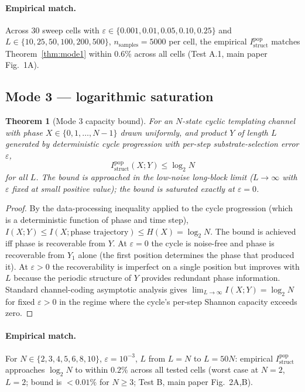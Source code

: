 \documentclass[11pt]{article}
\theoremstyle{plain}
\newtheorem{theorem}{Theorem}
\theoremstyle{definition}
\newcommand{\Istructpop}{I_{\mathrm{struct}}^{\mathrm{pop}}}
\begin{document}
\paragraph{Empirical match.} Across 30 sweep cells with $\varepsilon \in \{0.001, 0.01, 0.05, 0.10, 0.25\}$ and $L \in \{10, 25, 50, 100, 200, 500\}$, $n_{\mathrm{samples}} = 5000$ per cell, the empirical $\Istructpop$ matches Theorem~\ref{thm:mode1} within 0.6\% across all cells (Test A.1, main paper Fig.~1A).

\subsection{Mode 3 --- logarithmic saturation}

\begin{theorem}[Mode 3 capacity bound]
\label{thm:mode3}
For an $N$-state cyclic templating channel with phase $X \in \{0, 1, \ldots, N-1\}$ drawn uniformly, and product $Y$ of length $L$ generated by deterministic cycle progression with per-step substrate-selection error $\varepsilon$,
\[
\Istructpop(X; Y) \le \log_2 N
\]
for all $L$. The bound is approached in the low-noise long-block limit ($L \to \infty$ with $\varepsilon$ fixed at small positive value); the bound is saturated exactly at $\varepsilon = 0$.
\end{theorem}

\begin{proof}
By the data-processing inequality applied to the cycle progression (which is a deterministic function of phase and time step), $I(X; Y) \le I(X; \text{phase trajectory}) \le H(X) = \log_2 N$. The bound is achieved iff phase is recoverable from $Y$. At $\varepsilon = 0$ the cycle is noise-free and phase is recoverable from $Y_1$ alone (the first position determines the phase that produced it). At $\varepsilon > 0$ the recoverability is imperfect on a single position but improves with $L$ because the periodic structure of $Y$ provides redundant phase information. Standard channel-coding asymptotic analysis \citep[Theorem 8.7.1]{CoverThomas2006} gives $\lim_{L \to \infty} I(X; Y) = \log_2 N$ for fixed $\varepsilon > 0$ in the regime where the cycle's per-step Shannon capacity exceeds zero.
\end{proof}

\paragraph{Empirical match.} For $N \in \{2, 3, 4, 5, 6, 8, 10\}$, $\varepsilon = 10^{-3}$, $L$ from $L = N$ to $L = 50N$: empirical $\Istructpop$ approaches $\log_2 N$ to within $0.2\%$ across all tested cells (worst case at $N = 2$, $L = 2$; bound is $< 0.01\%$ for $N \ge 3$; Test B, main paper Fig.~2A,B).
\end{document}
